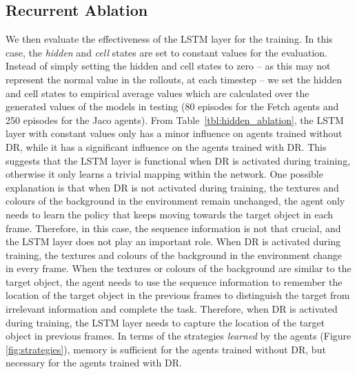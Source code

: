 \subsection{Recurrent Ablation}
\label{sec:detail_reucrrent_ablation}
We then evaluate the effectiveness of the LSTM layer for the training. In this case, the \textit{hidden} and \textit{cell} states are set to constant values for the evaluation. Instead of simply setting the hidden and cell states to zero -- as this may not represent the normal value in the rollouts, at each timestep -- we set the hidden and cell states to empirical average values which are calculated over the generated values of the models in testing (80 episodes for the Fetch agents and 250 episodes for the Jaco agents). From Table~\ref{tbl:hidden_ablation}, the LSTM layer with constant values only has a minor influence on agents trained without DR, while it has a significant influence on the agents trained with DR. This suggests that the LSTM layer is functional when DR is activated during training, otherwise it only learns a trivial mapping within the network. One possible explanation is that when DR is not activated during training, the textures and colours of the background in the environment remain unchanged, the agent only needs to learn the policy that keeps moving towards the target object in each frame. Therefore, in this case, the sequence information is not that crucial, and the LSTM layer does not play an important role. When DR is activated during training, the textures and colours of the background in the environment change in every frame. When the textures or colours of the background are similar to the target object, the agent needs to use the sequence information to remember the location of the target object in the previous frames to distinguish the target from irrelevant information and complete the task. Therefore, when DR is activated during training, the LSTM layer needs to capture the location of the target object in previous frames. In terms of the strategies \emph{learned} by the agents (Figure \ref{fig:strategies}), memory is sufficient for the agents trained without DR, but necessary for the agents trained with DR.

